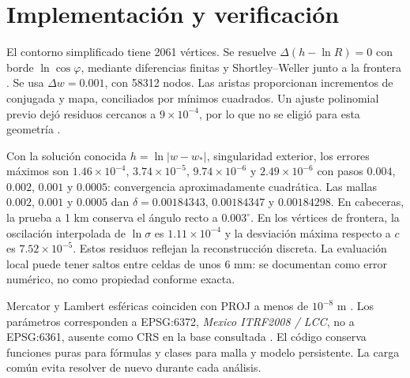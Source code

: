 \section{Implementación y verificación}
El contorno simplificado tiene 2061 vértices. Se resuelve $\Delta(h-\ln R)=0$ con borde $\ln\cos\varphi$, mediante diferencias finitas y Shortley--Weller junto a la frontera \cite{shortley1938}. Se usa $\Delta w=0.001$, con 58312 nodos. Las aristas proporcionan incrementos de conjugada y mapa, conciliados por mínimos cuadrados. Un ajuste polinomial previo dejó residuos cercanos a $9\times10^{-4}$, por lo que no se eligió para esta geometría \cite{brubeck2021}.

Con la solución conocida $h=\ln|w-w_*|$, singularidad exterior, los errores máximos son $1.46\times10^{-4}$, $3.74\times10^{-5}$, $9.74\times10^{-6}$ y $2.49\times10^{-6}$ con pasos $0.004$, $0.002$, $0.001$ y $0.0005$: convergencia aproximadamente cuadrática. Las mallas $0.002$, $0.001$ y $0.0005$ dan $\delta=0.00184343$, $0.00184347$ y $0.00184298$. En cabeceras, la prueba a 1 km conserva el ángulo recto a $0.003^\circ$. En los vértices de frontera, la oscilación interpolada de $\ln\sigma$ es $1.11\times10^{-4}$ y la desviación máxima respecto a $c$ es $7.52\times10^{-5}$. Estos residuos reflejan la reconstrucción discreta. La evaluación local puede tener saltos entre celdas de unos 6 mm: se documentan como error numérico, no como propiedad conforme exacta.

Mercator y Lambert esféricas coinciden con PROJ a menos de $10^{-8}$ m \cite{proj}. Los parámetros corresponden a EPSG:6372, \emph{Mexico ITRF2008 / LCC}, no a EPSG:6361, ausente como CRS en la base consultada \cite{epsg}. El código conserva funciones puras para fórmulas y clases para malla y modelo persistente. La carga común evita resolver de nuevo durante cada análisis.
